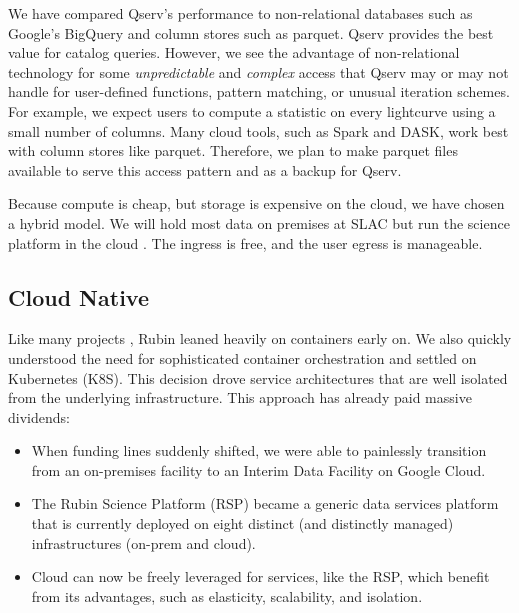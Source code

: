 \documentclass[11pt,twoside]{article}
\begin{document}
We have compared Qserv's performance to non-relational databases such as Google's BigQuery \citet[e.g.,][]{Document-31100} and column stores such as parquet.
Qserv provides the best value for catalog queries.
However, we see the advantage of non-relational technology for
some \emph{unpredictable} and \emph{complex} access that Qserv may or may not handle for user-defined functions, pattern matching, or unusual iteration schemes.
For example, we expect users to compute a statistic on every lightcurve using a small number of columns.
Many cloud tools, such as Spark and DASK, work best with column stores like parquet.
Therefore, we plan to make parquet files available to serve this access pattern and as a backup for Qserv.


Because compute is cheap, but storage is expensive on the cloud, we have chosen a hybrid model.
We will hold most data on premises at SLAC but run the science platform in the cloud \citep{2021arXiv211115030O}.
The ingress is free, and the user egress is manageable.

\subsection{Cloud Native}
\label{sec:cloudnative}
Like many projects \citep{2017ASPC..512...33O}, Rubin leaned heavily on containers early on.
We also quickly understood the need for sophisticated container orchestration and settled on Kubernetes (K8S).
This decision drove service architectures that are well isolated from the underlying infrastructure.
This approach has already paid massive dividends:

\begin{itemize}
\item When funding lines suddenly shifted, we were able to painlessly transition from an on-premises facility to an Interim Data Facility on Google Cloud.
\item The Rubin Science Platform (RSP) became a generic data services platform that is currently deployed on eight distinct (and distinctly managed) infrastructures (on-prem and cloud).
\item Cloud can now be freely leveraged for services, like the RSP, which benefit from its advantages, such as elasticity, scalability, and isolation.
\end{itemize}
\end{document}
